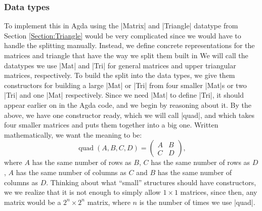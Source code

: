 \subsubsection{Data types}
To implement this in Agda using the |Matrix| and |Triangle| datatype from Section \ref{Section:Triangle} would be very complicated since we would have to handle the splitting manually. Instead, we define concrete representations for the matrices and triangle that have the way we split them built in%
We will call the datatypes we use |Mat| and |Tri| for general matrices and upper triangular matrices, respectively.
To build the split into the data types, we give them constructors for building a large |Mat| or |Tri| from four smaller |Mat|s or two |Tri| and one |Mat| respectively. Since we need |Mat| to define |Tri|, it should appear earlier on in the Agda code, and we begin by reasoning about it. By the above, we have one constructor ready, which we will call |quad|, and which takes four smaller matrices and puts them together into a big one.  Written mathematically, we want the meaning to be:
\begin{equation}
\operatorname{quad}(A,B,C,D) = 
\begin{pmatrix} 
  A & B \\
  C & D
\end{pmatrix},
\end{equation}
where $A$ has the same number of rows as $B$, $C$ has the same number of rows as $D$, $A$ has the same number of columns as $C$ and $B$ has the same number of columns as $D$.
Thinking about what ``small'' structures should have constructors, we we realize that it is not enough to simply allow $1 \times 1$ matrices, since then, any matrix would be a $2^n \times 2^n$ matrix, where $n$ is the number of times we use |quad|. 

